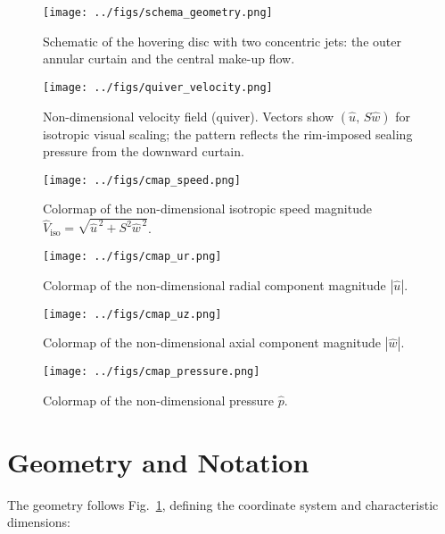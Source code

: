 \documentclass[11pt,a4paper]{article}
\begin{document}
\begin{figure}[t]
  \centering
  \texttt{[image: ../figs/schema\_geometry.png]}
  \caption{Schematic of the hovering disc with two concentric jets: the outer annular curtain and the central make-up flow.}
  \label{fig:geometry}
\end{figure}\begin{figure}[H]
  \centering
  \texttt{[image: ../figs/quiver\_velocity.png]}
  \caption{Non-dimensional velocity field (quiver).
Vectors show $(\hat u,\,S\hat w)$ for isotropic visual scaling; the pattern reflects the rim-imposed sealing pressure from the downward curtain.}
  \label{fig:quiver}
\end{figure}\begin{figure}[H]
  \centering
  \texttt{[image: ../figs/cmap\_speed.png]}
  \caption{Colormap of the non-dimensional isotropic speed magnitude $\hat V_{\mathrm{iso}}=\sqrt{\hat u^{\,2}+S^{2}\hat w^{\,2}}$.}
  \label{fig:cmap_speed}
\end{figure}\begin{figure}[H]
  \centering
  \texttt{[image: ../figs/cmap\_ur.png]}
  \caption{Colormap of the non-dimensional radial component magnitude $|\hat u|$.}
  \label{fig:cmap_ur}
\end{figure}\begin{figure}[H]
  \centering
  \texttt{[image: ../figs/cmap\_uz.png]}
  \caption{Colormap of the non-dimensional axial component magnitude $|\hat w|$.}
  \label{fig:cmap_uz}
\end{figure}\begin{figure}[H]
  \centering
  \texttt{[image: ../figs/cmap\_pressure.png]}
  \caption{Colormap of the non-dimensional pressure $\hat p$.}
  \label{fig:cmap_p}
\end{figure}\section{Geometry and Notation}
\label{sec:geometry}
The geometry follows Fig.~\ref{fig:geometry}, defining the coordinate system and characteristic dimensions:
\end{document}
